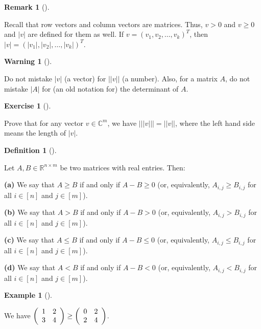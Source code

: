 \documentclass[numbers=enddot,12pt,final,onecolumn,notitlepage]{scrartcl}%
\newcounter{exer}
\numberwithin{exer}{subsection}
\theoremstyle{definition}
\newtheorem{defi}[theo]{Definition}
\newenvironment{definition}[1][]
{\begin{defi}[#1]\begin{leftbar}}
{\end{leftbar}\end{defi}}
\newtheorem{remk}[theo]{Remark}
\newenvironment{remark}[1][]
{\begin{remk}[#1]\begin{leftbar}}
{\end{leftbar}\end{remk}}
\newtheorem{warn}[theo]{Warning}
\newenvironment{warning}[1][]
{\begin{warn}[#1]\begin{leftbar}}
{\end{leftbar}\end{warn}}
\newtheorem{exam}[theo]{Example}
\newenvironment{example}[1][]
{\begin{exam}[#1]\begin{leftbar}}
{\end{leftbar}\end{exam}}
\newtheorem{exmp}[exer]{Exercise}
\newenvironment{exercise}[1][]
{\begin{exmp}[#1]\begin{leftbar}}
{\end{leftbar}\end{exmp}}
\newenvironment{warning}[1][Warning]{\noindent\textbf{#1.} }{\ \rule{0.5em}{0.5em}}
\begin{document}
\begin{remark}
Recall that row vectors and column vectors are matrices. Thus, $v>0$ and
$v\geq0$ and $\left\vert v\right\vert $ are defined for them as well. If
$v=\left(  v_{1},v_{2},\ldots,v_{k}\right)  ^{T}$, then $\left\vert
v\right\vert =\left(  \left\vert v_{1}\right\vert ,\left\vert v_{2}\right\vert
,\ldots,\left\vert v_{k}\right\vert \right)  ^{T}$.
\end{remark}

\begin{warning}
Do not mistake $\left\vert v\right\vert $ (a vector) for $\left\vert
\left\vert v\right\vert \right\vert $ (a number). Also, for a matrix $A$, do
not mistake $\left\vert A\right\vert $ for (an old notation for) the
determinant of $A$.
\end{warning}

\begin{exercise}
Prove that for any vector $v\in\mathbb{C}^{m}$, we have $\left\vert \left\vert
\left\vert v\right\vert \right\vert \right\vert =\left\vert \left\vert
v\right\vert \right\vert $, where the left hand side means the length of
$\left\vert v\right\vert $.
\end{exercise}

\begin{definition}
Let $A,B\in\mathbb{R}^{n\times m}$ be two matrices with real entries. Then:

\textbf{(a)} We say that $A\geq B$ if and only if $A-B\geq0$ (or,
equivalently, $A_{i,j}\geq B_{i,j}$ for all $i\in\left[  n\right]  $ and
$j\in\left[  m\right]  $).

\textbf{(b)} We say that $A>B$ if and only if $A-B>0$ (or, equivalently,
$A_{i,j}>B_{i,j}$ for all $i\in\left[  n\right]  $ and $j\in\left[  m\right]
$).

\textbf{(c)} We say that $A\leq B$ if and only if $A-B\leq0$ (or,
equivalently, $A_{i,j}\leq B_{i,j}$ for all $i\in\left[  n\right]  $ and
$j\in\left[  m\right]  $).

\textbf{(d)} We say that $A<B$ if and only if $A-B<0$ (or, equivalently,
$A_{i,j}<B_{i,j}$ for all $i\in\left[  n\right]  $ and $j\in\left[  m\right]
$).
\end{definition}

\begin{example}
We have $\left(
\begin{array}
[c]{cc}%
1 & 2\\
3 & 4
\end{array}
\right)  \geq\left(
\begin{array}
[c]{cc}%
0 & 2\\
2 & 4
\end{array}
\right)  $.
\end{example}
\end{document}
